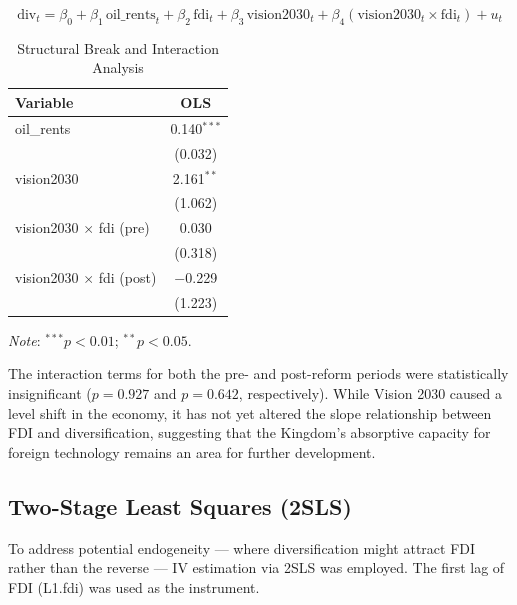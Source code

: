 \documentclass[12pt, a4paper]{article}
\begin{document}
\begin{equation}
    \text{div}_t = \beta_0 + \beta_1\,\text{oil\_rents}_t + \beta_2\,\text{fdi}_t + \beta_3\,\text{vision2030}_t + \beta_4(\text{vision2030}_t \times \text{fdi}_t) + u_t
\end{equation}

\begin{table}[H]
\centering
\begin{threeparttable}
\caption{Structural Break and Interaction Analysis}
\label{tab:interaction}
\begin{tabular}{lc}
    \toprule
    \textbf{Variable} & \textbf{OLS} \\
    \midrule
    oil\_rents                      & 0.140$^{***}$ \\
                                    & (0.032) \\[4pt]
    vision2030                      & 2.161$^{**}$ \\
                                    & (1.062) \\[4pt]
    vision2030 $\times$ fdi (pre)   & 0.030 \\
                                    & (0.318) \\[4pt]
    vision2030 $\times$ fdi (post)  & $-$0.229 \\
                                    & (1.223) \\
    \bottomrule
\end{tabular}
\begin{tablenotes}
    \small
    \item \textit{Note}: $^{***}p < 0.01$; $^{**}p < 0.05$.
\end{tablenotes}
\end{threeparttable}
\end{table}

The interaction terms for both the pre- and post-reform periods were statistically insignificant ($p = 0.927$ and $p = 0.642$, respectively). While Vision 2030 caused a level shift in the economy, it has not yet altered the slope relationship between FDI and diversification, suggesting that the Kingdom's absorptive capacity for foreign technology remains an area for further development.

\subsection{Two-Stage Least Squares (2SLS)}

To address potential endogeneity --- where diversification might attract FDI rather than the reverse --- IV estimation via 2SLS was employed. The first lag of FDI (L1.fdi) was used as the instrument.
\end{document}
